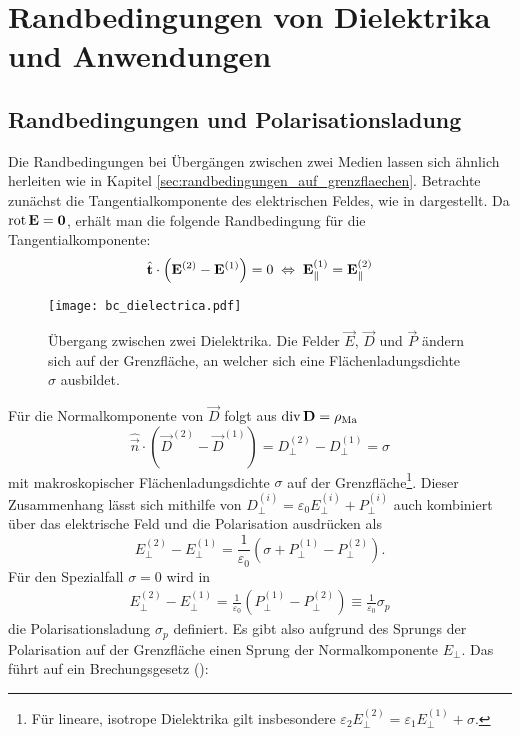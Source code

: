 \section{Randbedingungen von Dielektrika und Anwendungen}

\subsection{Randbedingungen und Polarisationsladung}

Die Randbedingungen bei Übergängen zwischen zwei Medien lassen sich ähnlich herleiten wie in Kapitel \ref{sec:randbedingungen_auf_grenzflaechen}. Betrachte zunächst die Tangentialkomponente des elektrischen Feldes, wie in  dargestellt. Da $\operatorname{rot} \mathbf{E}=\mathbf{0}$, erhält man die folgende Randbedingung für die Tangentialkomponente:
\begin{equation*}
	\hat{\mathbf{t}}\cdot \left(\mathbf{E}^{\left(2\right)}-\mathbf{E}^{\left(1\right)}\right)=0\;\Leftrightarrow\; \mathbf{E}_{\parallel }^{\left(1\right)}=\mathbf{E}_{\parallel }^{\left(2\right)}
\end{equation*}


\begin{figure}[htb]
	\centering
	\texttt{[image: bc\_dielectrica.pdf]}
	\caption{Übergang zwischen zwei Dielektrika. Die Felder $\vec E$, $\vec D$ und $\vec P$ ändern sich auf der Grenzfläche, an welcher sich eine Flächenladungsdichte $\sigma$ ausbildet. }
	\label{fig:bc_dielectrica}
\end{figure}

Für die Normalkomponente von $\vec {D}$ folgt aus $\operatorname{div} \mathbf{D}=\rho _{\mathrm{Ma}}$
\begin{equation*}
	\hat{\vec {n}}\cdot \left(\vec {D}^{\left(2\right)}-\vec {D}^{\left(1\right)}\right)=D_{\perp }^{\left(2\right)}-D_{\perp }^{\left(1\right)}=\sigma
\end{equation*}
mit makroskopischer Flächenladungsdichte $\sigma $ auf der Grenzfläche\footnote{Für lineare, isotrope Dielektrika gilt insbesondere $\varepsilon _{2}E_{\perp }^{\left(2\right)}=\varepsilon _{1}E_{\perp }^{\left(1\right)}+\sigma .$}. Dieser Zusammenhang lässt sich mithilfe von $D_{\perp }^{\left(i\right)}=\varepsilon _{0}E_{\perp }^{\left(i\right)}+P_{\perp }^{\left(i\right)}$ auch kombiniert über das elektrische Feld und die Polarisation ausdrücken als
\begin{equation*}
	E_{\perp }^{\left(2\right)}-E_{\perp }^{\left(1\right)}=\frac{1}{\varepsilon _{0}}\left(\sigma +P_{\perp }^{\left(1\right)}-P_{\perp }^{\left(2\right)}\right).
\end{equation*}
Für den Spezialfall $\sigma =0$ wird in
\begin{align*}
	E_{\perp }^{\left(2\right)}-E_{\perp }^{\left(1\right)}=\frac{1}{\varepsilon _{0}}\left(P_{\perp }^{\left(1\right)}-P_{\perp }^{\left(2\right)}\right)\equiv \frac{1}{\varepsilon _{0}}\sigma _{p}
\end{align*}
die Polarisationsladung $\sigma _{p}$ definiert. Es gibt also aufgrund des Sprungs der Polarisation auf der Grenzfläche einen Sprung der Normalkomponente $E_{\perp }$. Das führt auf ein Brechungsgesetz ():

